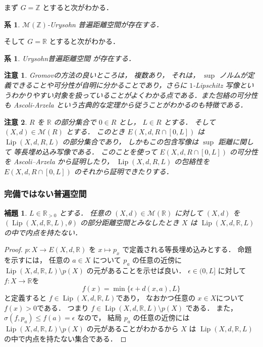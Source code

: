 \documentclass[leqno, 12pt]{jsarticle}
\newtheorem{cor}[thm]{系}
\newtheorem{lem}[thm]{補題}
\newtheorem*{rmk}{注意}
\newcommand{\zz}{\mathbb{Z}}
\newcommand{\rr}{\mathbb{R}}
\DeclareMathOperator{\lip}{Lip}
\begin{document}
まず
$G=\zz$
とすると次がわかる．
\begin{cor}\label{cor:func:gromovint}
$\mathscr{M}(\zz)$-Urysohn
普遍距離空間が存在する．
\end{cor}


そして
$G=\rr$
とすると次がわかる．
\begin{cor}\label{cor:func:gromovUrysohn}
Urysohn普遍距離空間
が存在する．
\end{cor}


\begin{rmk}
Gromovの方法の良いところは，
複数あり，
それは，
$\sup$
ノルムが定義できることや可分性が自明に分かることであり，さらに
$1$-Lipschitz
写像というわかりやすい対象を扱っていることがよくわかる点である．また包絡の可分性も
Ascoli-Arzela
という古典的な定理から従うことがわかるのも特徴である．
\end{rmk}

\begin{rmk}
$R$
を
$\rr$
の部分集合で
$0\in R$
とし，
$L\in R$
とする．
そして
$(X, d)\in \mathscr{M}(R)$
とする．
このとき
$E(X, d, R\cap [0, L])$
は
$\lip(X, d, R, L)$
の部分集合であり，
しかもこの包含写像は
$\sup$
距離に関して
等長埋め込み写像である．
このことを使って
$E(X, d, R\cap [0, L])$
の可分性を
Ascoli--Arzela
から証明したり，
$\lip(X, d, R, L)$
の包絡性を
$E(X, d, R\cap [0, L])$
のそれから証明できたりする．
\end{rmk}



\subsubsection{完備ではない普遍空間}


\begin{lem}\label{lem:func:naitenL}
$L\in \rr_{>0}$
とする．
任意の
$(X, d)\in \mathscr{M}(\rr)$
に対して
$(X, d)$
を
$(\lip(X, d, \rr, L), \theta)$
の部分距離空間とみなしたとき
$X$
は
$\lip(X, d, \rr, L)$
の中で内点を持たない．
\end{lem}
\begin{proof}
$p\colon  X\to E(X, d, \rr)$
を
$x\mapsto p_{x}$
で定義される等長埋め込みとする．
命題を示すには，
任意の
$a\in X$
について
$p_{a}$
の任意の近傍に
$\lip(X, d, \rr, L)\setminus p(X)$
の元があることを示せば良い．
$\epsilon \in (0, L]$
に対して
$f\colon  X\to \rr$を
\[
f(x)=\min\{\epsilon +d(x, a), L\}
\]
と定義すると
$f\in \lip(X, d, \rr, L)$であり，
なおかつ任意の
$x\in X$について
$f(x)>0$である．
つまり
$f\in \lip(X, d, \rr, L)\setminus p(X)$
である．
また，
$\sigma(f, p_a)\le f(a)=\epsilon$
なので，
結局
$p_{a}$
の任意の近傍には
$\lip(X, d, \rr, L)\setminus p(X)$
の元があることがわかるから
$X$
は
$\lip(X, d, \rr, L)$の中で内点を持たない集合である．
\end{proof}
\end{document}
